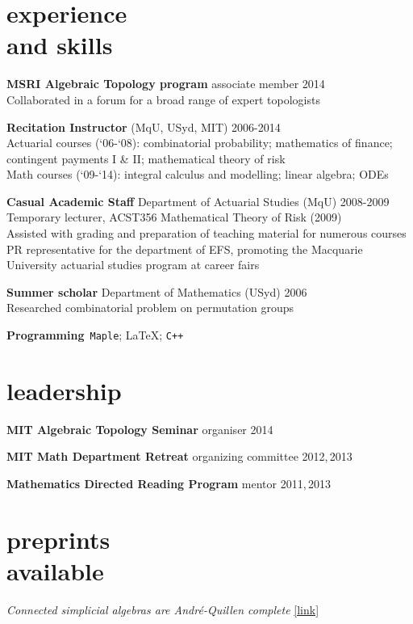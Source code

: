 \documentclass[margin,line]{resume}
\newcommand{\dashtab}{\makebox[1cm][r]{$-$ }}
\newcommand{\whitetab}{\makebox[1cm][r]{ }}
\newcommand{\CVsection}[1]{\section{\mysidestyle #1}}
\newcommand{\entry}[3]{\textbf{#1} #2 \hfill {#3}
           
\vspace{-3.4mm}}
\newcommand{\twolineentry}[4]{\textbf{#1} #2 \hfill {#4}\\%
#3
           
\vspace{-3.4mm}}
\newcommand{\FINALentry}[3]{\textbf{#1} #2 \hfill {#3}\\\vspace{-.55cm}}
\begin{document}
\begin{resume}
\CVsection{experience\\and skills}
\twolineentry{MSRI Algebraic Topology program}{associate member}{\dashtab Collaborated in a forum for a broad range of expert topologists}{2014}
\twolineentry{Recitation Instructor}{(MqU, USyd, MIT)}{
\dashtab Actuarial courses (`06-`08): combinatorial probability; mathematics of finance;\\
\whitetab contingent payments I \& II; mathematical theory of risk \\
\dashtab Math courses (`09-`14): integral calculus and modelling; linear algebra; ODEs
}{2006-2014}
\twolineentry{Casual Academic Staff}{Department of Actuarial Studies (MqU)}{%
\dashtab Temporary lecturer, ACST356 Mathematical Theory of Risk (2009)\\
\dashtab Assisted with grading and preparation of teaching material for numerous courses\\
\dashtab PR representative for the department of EFS, promoting the Macquarie\\\whitetab University actuarial studies program at career fairs%
}{2008-2009}
\twolineentry{Summer scholar}{Department of Mathematics (USyd)}{%
\dashtab Researched combinatorial problem on permutation groups
}{2006}
\FINALentry{Programming}{\,\texttt{Maple}; \LaTeX; \texttt{C++}}{}

\CVsection{leadership}
\entry{MIT Algebraic Topology Seminar}{organiser}{2014}
\entry{MIT Math Department Retreat}{organizing committee}{2012,\,2013}
\FINALentry{Mathematics Directed Reading Program}{mentor}{2011,\,2013}

\vspace{-.2cm}
\CVsection{preprints\\available}
\vspace{.2cm}
\FINALentry{\hspace{-.275em}}{\emph{Connected simplicial algebras are Andr\'e-Quillen complete} \href{http://arxiv.org/abs/1410.8244}{[link]}}{}


\end{resume}
\end{document}
